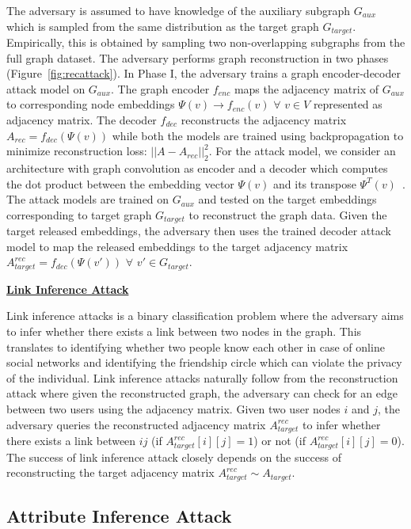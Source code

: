 The adversary is assumed to have knowledge of the auxiliary subgraph $G_{aux}$ which is sampled from the same distribution as the target graph $G_{target}$.
Empirically, this is obtained by sampling two non-overlapping subgraphs from the full graph dataset.
The adversary performs graph reconstruction in two phases (Figure~\ref{fig:recattack}).
In Phase I, the adversary trains a graph encoder-decoder attack model on $G_{aux}$.
The graph encoder $f_{enc}$ maps the adjacency matrix of $G_{aux}$ to corresponding node embeddings $\Psi (v)\rightarrow f_{enc}(v)$ $\forall$ $v \in V$ represented as adjacency matrix.
The decoder $f_{dec}$ reconstructs the adjacency matrix $A_{rec} = f_{dec}(\Psi (v))$ while both the models are trained using backpropagation to minimize reconstruction loss: $||A - A_{rec}||_2^2$.
For the attack model, we consider an architecture with graph convolution as encoder and a decoder which computes the dot product between the embedding vector $\Psi (v)$ and its transpose $\Psi^T (v)$~\cite{Kipf2016tc}.
The attack models are trained on $G_{aux}$ and tested on the target embeddings corresponding to target graph $G_{target}$ to reconstruct the graph data.
Given the target released embeddings, the adversary then uses the trained decoder attack model to map the released embeddings to the target adjacency matrix $A_{target}^{rec} = f_{dec}(\Psi (v'))$ $\forall$ $v'\in G_{target}$.

\noindent\textbf{\underline{Link Inference Attack}}

\noindent Link inference attacks is a binary classification problem where the adversary aims to infer whether there exists a link between two nodes in the graph.
This translates to identifying whether two people know each other in case of online social networks and identifying the friendship circle which can violate the privacy of the individual.
Link inference attacks naturally follow from the reconstruction attack where given the reconstructed graph, the adversary can check for an edge between two users using the adjacency matrix.
Given two user nodes $i$ and $j$, the adversary queries the reconstructed adjacency matrix $A_{target}^{rec}$ to infer whether there exists a link between $ij$ (if $A_{target}^{rec}[i][j] = 1$) or not (if $A_{target}^{rec}[i][j] = 0$).
The success of link inference attack closely depends on the success of reconstructing the target adjacency matrix $A_{target}^{rec} \sim A_{target}$.



\subsection{Attribute Inference Attack}

